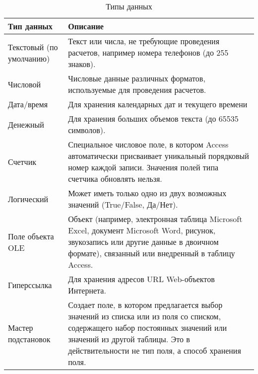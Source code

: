 \begin{xltabular}[h]{\textwidth}{|p{0.2 \textwidth}|X|}
    \caption{Типы данных\label{tab:data-types}} \\
    \hline
    \textbf{Тип данных} & \textbf{Описание} \\
    \hline \endhead
    Текстовый (по умолчанию) & Текст или числа, не требующие проведения расчетов, например номера телефонов (до 255 знаков). \\ \hline
    Числовой & Числовые данные различных форматов, используемые для проведения расчетов. \\ \hline
    Дата/время & Для хранения календарных дат и текущего времени \\ \hline
    Денежный & Для хранения больших объемов текста (до 65535 символов). \\ \hline
    Счетчик & Специальное числовое поле, в котором Access автоматически присваивает уникальный порядковый номер каждой записи. Значения полей типа счетчика обновлять нельзя. \\ \hline
    Логический & Может иметь только одно из двух возможных значений (True/False, Да/Нет). \\ \hline
    Поле объекта OLE & Объект (например, электронная таблица Microsoft Excel, документ Microsoft Word, рисунок, звукозапись или другие данные в двоичном формате), связанный или внедренный в таблицу Access. \\ \hline
    Гиперссылка & Для хранения адресов URL Web-объектов Интернета. \\ \hline
    Мастер подстановок & Создает поле, в котором предлагается выбор значений из списка или из поля со списком, содержащего набор постоянных значений или значений из другой таблицы. Это в действительности не тип поля, а способ хранения поля. \\ \hline
\end{xltabular}


\renewcommand{\img}[2]{
    \begin{figure}[H]
        \center{\texttt{[image: graphics/\#1]}}
        \caption{#2}
        \label{fig:#1}
    \end{figure}
}
\renewcommand{\tab}{\hspace{1cm}}



